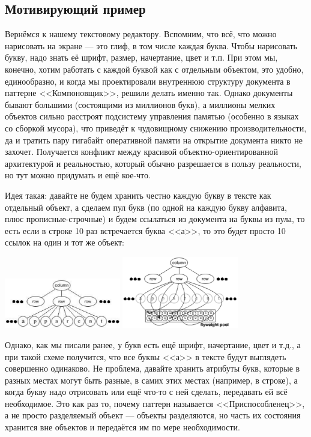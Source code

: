 \documentclass{../text-style}
\begin{document}
\subsection{Мотивирующий пример}

Вернёмся к нашему текстовому редактору. Вспомним, что всё, что можно нарисовать на экране --- это глиф, в том числе каждая буква. Чтобы нарисовать букву, надо знать её шрифт, размер, начертание, цвет и т.п. При этом мы, конечно, хотим работать с каждой буквой как с отдельным объектом, это удобно, единообразно, и когда мы проектировали внутреннюю структуру документа в паттерне <<Компоновщик>>, решили делать именно так. Однако документы бывают большими (состоящими из миллионов букв), а миллионы мелких объектов сильно расстроят подсистему управления памятью (особенно в языках со сборкой мусора), что приведёт к чудовищному снижению производительности, да и тратить пару гигабайт оперативной памяти на открытие документа никто не захочет. Получается конфликт между красивой объектно-ориентированной архитектурой и реальностью, который обычно разрешается в пользу реальности, но тут можно придумать и ещё кое-что.

Идея такая: давайте не будем хранить честно каждую букву в тексте как отдельный объект, а сделаем пул букв (по одной на каждую букву алфавита, плюс прописные-строчные) и будем ссылаться из документа на буквы из пула, то есть если в строке 10 раз встречается буква <<а>>, то это будет просто 10 ссылок на один и тот же объект:

\begin{center}
    \includegraphics[width=0.38\textwidth]{noFlyweight.png}
    \raisebox{0.1\textheight}{\quad\Huge{$\rightarrow$}\quad}
    \includegraphics[width=0.38\textwidth]{flyweightExample.png}
\end{center}

Однако, как мы писали ранее, у букв есть ещё шрифт, начертание, цвет и т.д., а при такой схеме получится, что все буквы <<а>> в тексте будут выглядеть совершенно одинаково. Не проблема, давайте хранить атрибуты букв, которые в разных местах могут быть разные, в самих этих местах (например, в строке), а когда букву надо отрисовать или ещё что-то с ней сделать, передавать ей всё необходимое. Это как раз то, почему паттерн называется <<Приспособленец>>, а не просто разделяемый объект --- объекты разделяются, но часть их состояния хранится вне объектов и передаётся им по мере необходимости.
\end{document}
